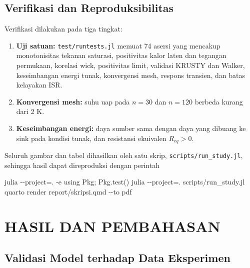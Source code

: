 \documentclass[
  indonesian,
  12pt,
  a4paper,
]{report}
\newenvironment{Shaded}{\begin{snugshade}}{\end{snugshade}}
\newcommand{\AttributeTok}[1]{\textcolor[rgb]{0.40,0.45,0.13}{#1}}
\newcommand{\ExtensionTok}[1]{\textcolor[rgb]{0.00,0.23,0.31}{#1}}
\newcommand{\NormalTok}[1]{\textcolor[rgb]{0.00,0.23,0.31}{#1}}
\newcommand{\OperatorTok}[1]{\textcolor[rgb]{0.37,0.37,0.37}{#1}}
\newcommand{\StringTok}[1]{\textcolor[rgb]{0.13,0.47,0.30}{#1}}
\providecommand{\tightlist}{%
  \setlength{\itemsep}{0pt}\setlength{\parskip}{0pt}}
\begin{document}
\section{Verifikasi dan
Reproduksibilitas}\label{verifikasi-dan-reproduksibilitas}

Verifikasi dilakukan pada tiga tingkat:

\begin{enumerate}
\def\labelenumi{\arabic{enumi}.}
\tightlist
\item
  \textbf{Uji satuan:} \texttt{test/runtests.jl} memuat 74 asersi yang
  mencakup monotonisitas tekanan saturasi, positivitas kalor laten dan
  tegangan permukaan, korelasi wick, positivitas limit, validasi KRUSTY
  dan Walker, keseimbangan energi tunak, konvergensi mesh, respons
  transien, dan batas kelayakan ISR.
\item
  \textbf{Konvergensi mesh:} suhu uap pada \(n=30\) dan \(n=120\)
  berbeda kurang dari 2 K.
\item
  \textbf{Keseimbangan energi:} daya sumber sama dengan daya yang
  dibuang ke sink pada kondisi tunak, dan resistansi ekuivalen
  \(R_{eq}>0\).
\end{enumerate}

Seluruh gambar dan tabel dihasilkan oleh satu skrip,
\texttt{scripts/run\_study.jl}, sehingga hasil dapat direproduksi dengan
perintah

\begin{Shaded}
\begin{Highlighting}[]
\ExtensionTok{julia} \AttributeTok{{-}{-}project}\OperatorTok{=}\NormalTok{. }\AttributeTok{{-}e} \StringTok{\textquotesingle{}using Pkg; Pkg.test()\textquotesingle{}}
\ExtensionTok{julia} \AttributeTok{{-}{-}project}\OperatorTok{=}\NormalTok{. scripts/run\_study.jl}
\ExtensionTok{quarto}\NormalTok{ render report/skripsi.qmd }\AttributeTok{{-}{-}to}\NormalTok{ pdf}
\end{Highlighting}
\end{Shaded}

\chapter{HASIL DAN PEMBAHASAN}\label{sec-results-discussion}

\section{Validasi Model terhadap Data
Eksperimen}\label{validasi-model-terhadap-data-eksperimen}
\end{document}
